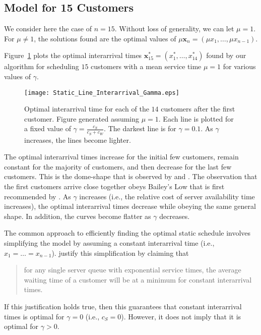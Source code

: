 \subsection{Model for 15 Customers}
We consider here the case of $n = 15$. Without loss of generality, we can let $\mu = 1$. For $\mu \neq 1$, the solutions found are the optimal values of $\mu \mathbf{x}_{n} = (\mu x_{1}, \ldots, \mu x_{n - 1})$.

Figure~\ref{fig:Static_Time_Gamma} plots the optimal interarrival times $\mathbf{x}_{15}^{*} = (x_{1}^{*}, \ldots, x_{14}^{*})$ found by our algorithm for scheduling $15$ customers with a mean service time $\mu = 1$ for various values of $\gamma$.
\begin{figure}[htb]
	\centering
	\texttt{[image: Static\_Line\_Interarrival\_Gamma.eps]}
	\caption{Optimal interarrival time for each of the $14$ customers after the first customer. Figure generated assuming $\mu = 1$. Each line is plotted for a fixed value of $\gamma = \frac{c_{S}}{c_{S} + c_{W}}$. The darkest line is for $\gamma = 0.1$. As $\gamma$ increases, the lines become lighter.}
	\label{fig:Static_Time_Gamma}
\end{figure}

The optimal interarrival times increase for the initial few customers, remain constant for the majority of customers, and then decrease for the last few customers. This is the dome-shape that is observed by \citet{Stein} and \citet{Mendel}. The observation that the first customers arrive close together obeys Bailey's Low that is first recommended by \citet{Bailey}. As $\gamma$ increases (i.e., the relative cost of server availability time increases), the optimal interarrival times decrease while obeying the same general shape. In addition, the curves become flatter as $\gamma$ decreases.

The common approach to efficiently finding the optimal static schedule involves simplifying the model by assuming a constant interarrival time (i.e., $x_{1} = \ldots = x_{n - 1}$). \citet{Stein} justify this simplification by claiming that
\begin{quote}
for any single server queue with exponential service times, the average waiting time of a customer will be at a minimum for constant interarrival times.
\end{quote}

If this justification holds true, then this guarantees that constant interarrival times is optimal for $\gamma = 0$ (i.e., $c_{S} = 0$). However, it does not imply that it is optimal for $\gamma > 0$.

